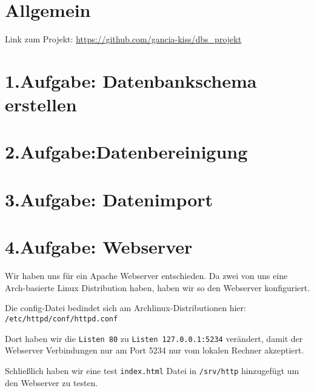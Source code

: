 \usepackage{graphicx}
\usepackage{listings} %

\newcommand{\dozent}{Prof.  Dr.  Agnès Voisard, Nicolas Lehmann}					%
\newcommand{\tutor}{Hoffman Christian}						%
\newcommand{\tutoriumNo}{Tutorium 3}				%
\newcommand{\projectNo}{2.Iteration}									%
\newcommand{\veranstaltung}{Datenbank Systeme}	%
\newcommand{\semester}{SoeSe 2017}						%
\newcommand{\studenten}{Ingrid Tchilibou, Emil Milanov, Boyan Hristov}			%






\section*{Allgemein}
Link zum Projekt: \url{https://github.com/gancia-kiss/dbs_projekt}

\section*{1.Aufgabe: Datenbankschema erstellen}


\section*{2.Aufgabe:Datenbereinigung}


\section*{3.Aufgabe: Datenimport}


\section*{4.Aufgabe: Webserver}

Wir haben uns für ein Apache Webserver entschieden. Da zwei von uns eine Arch-basierte Linux Distribution haben, haben wir so den Webserver konfiguriert.

Die config-Datei bedindet sich am Archlinux-Distributionen hier: 
\lstinline|/etc/httpd/conf/httpd.conf|

Dort haben wir die \lstinline|Listen 80| zu \lstinline|Listen 127.0.0.1:5234| verändert, damit der Webserver Verbindungen nur am Port 5234 nur vom lokalen Rechner akzeptiert.

Schließlich haben wir eine test \lstinline|index.html| Datei in \lstinline|/srv/http| hinzugefügt um den Webserver zu testen.





